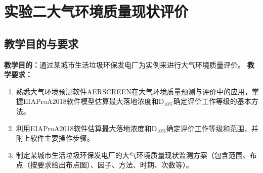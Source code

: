 \newpage\null\par
\section{实验二\hspace{1em}大气环境质量现状评价}
\subsection{教学目的与要求}
\noindent\textbf{教学目的：}通过某城市生活垃圾环保发电厂为实例来进行大气环境质量评价。\newline
\noindent\textbf{教学要求：}
\begin{enumerate}
    \item 熟悉大气环境预测软件AERSCREEN在大气环境质量预测与评价中的应用，掌握EIAProA2018软件模型估算最大落地浓度和$\mathrm{D_{10\%}}$确定评价工作等级的基本方法。
    \item 利用EIAProA2018软件估算最大落地浓度和$\mathrm{D_{10\%}}$确定评价工作等级和范围，并附上软件主要操作步骤。
    \item 制定某城市生活垃圾环保发电厂的大气环境质量现状监测方案（包含范围、布点（按要求给出布点图）、因子、方法、时期、次数等）。
\end{enumerate}

